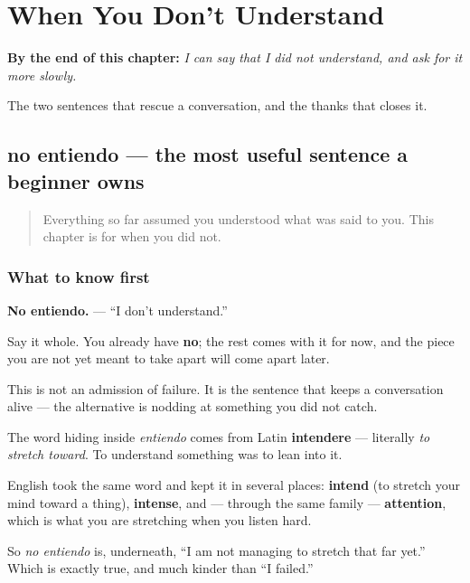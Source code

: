 
\chapter{When You Don't Understand}
\label{ch:repair}

\begin{chapteropening}
\textbf{By the end of this chapter:} \emph{I can say that I did not understand, and ask for it more slowly.}

The two sentences that rescue a conversation, and the thanks that closes it.
\end{chapteropening}

\section[no entiendo]{no entiendo — the most useful sentence a beginner owns}

\label{lesson:ES-R01-no-entiendo}



\begin{quote}
Everything so far assumed you understood what was said to you. This chapter is for when you did not.
\end{quote}

\subsection*{What to know first}
\textbf{No entiendo.} — \textquotedblleft{}I don't understand.\textquotedblright{}

Say it whole. You already have \textbf{no}; the rest comes with it for now, and the piece you are not yet meant to take apart will come apart later.

This is not an admission of failure. It is the sentence that keeps a conversation alive — the alternative is nodding at something you did not catch.

\begin{cousinweb}
The word hiding inside \emph{entiendo} comes from Latin \textbf{intendere} — literally \emph{to stretch toward}. To understand something was to lean into it.

English took the same word and kept it in several places: \textbf{intend} (to stretch your mind toward a thing), \textbf{intense}, and — through the same family — \textbf{attention}, which is what you are stretching when you listen hard.

So \emph{no entiendo} is, underneath, \textquotedblleft{}I am not managing to stretch that far yet.\textquotedblright{} Which is exactly true, and much kinder than \textquotedblleft{}I failed.\textquotedblright{}
\end{cousinweb}

